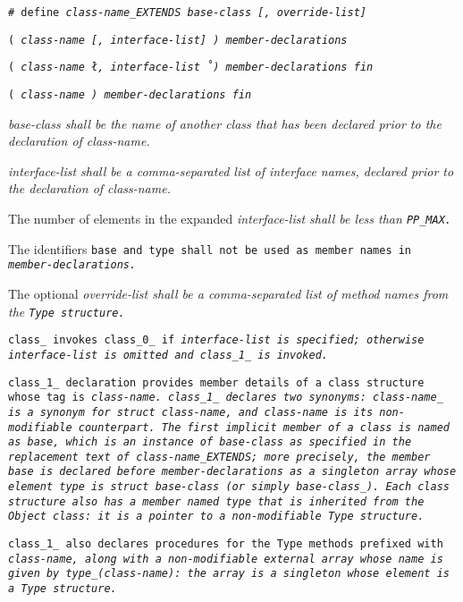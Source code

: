 
\tt{# define} \it{class-name}\tt{_EXTENDS}
\it{base-class} [\tt{,} \it{override-list}]

\s\s\s\tt{(} \it{class-name} [\tt{,}
\it{interface-list}]   \tt{)} \it{member-declarations} 

\s\tt{(} \it{class-name}  \l\tt{,}
\it{interface-list}\r\ \tt{)} \it{member-declarations}  \tt{fin}

\s\tt{(} \it{class-name} \tt{)} \it{member-declarations} \tt{fin}


\it{base-class} shall be the name of another class that has
 been  declared prior to the declaration of \it{class-name}.

\it{interface-list} shall be a comma-separated list of interface
names, declared prior to the declaration of \it{class-name}.

The number of elements in the expanded
\it{interface-list} shall be less than \tt{PP_MAX}.

The identifiers \tt{base} and \tt{type} shall not be
used as member names in \it{member-declarations}.

The optional \it{override-list} shall be a comma-separated
list of method names from the \tt{Type} structure.


\tt{class_} invokes \tt{class_0_} if \it{interface-list} is specified;
otherwise \it{interface-list} is omitted and \tt{class_1_} is invoked.

\tt{class_1_} declaration provides member details
of a class structure whose tag is \it{class-name}.
\tt{class_1_} declares two synonyms: \it{class-name}\_ is a synonym for
\tt{struct} \it{class-name}, and \it{class-name} is its non-modifiable counterpart.
The first implicit member of a class is named as \tt{base}, which is
an instance of \it{base-class} as specified in the replacement text
of \it{class-name}\tt{_EXTENDS}; more precisely, the member \tt{base}
is declared before \it{member-declarations} as a singleton array whose
element type is \tt{struct} \it{base-class} (or simply \it{base-class}\_).
Each class structure also has a member named \tt{type} that is inherited from
the \tt{Object} class: it is a pointer to a non-modifiable \tt{Type} structure.

\tt{class_1_} also declares procedures for the \tt{Type} methods
prefixed with \it{class-name}, along with a non-modifiable external
array whose name is given by \tt{type_(}\it{class-name}\tt{)}:
the array is a singleton whose element is a \tt{Type} structure.


